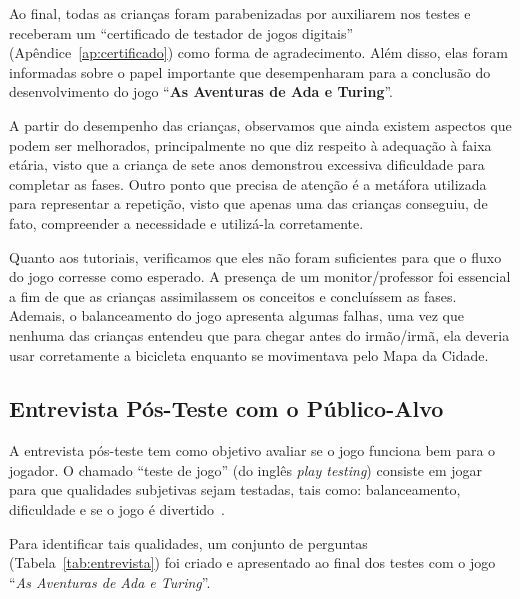Ao final, todas as crianças foram parabenizadas por auxiliarem nos testes e receberam um “certificado de testador de jogos digitais” (Apêndice~\ref{ap:certificado}) como forma de agradecimento. Além disso, elas foram informadas sobre o papel importante que desempenharam para a conclusão do desenvolvimento do jogo “\textbf{As Aventuras de Ada e Turing}”.

A partir do desempenho das crianças, observamos que ainda existem aspectos que podem ser melhorados, principalmente no que diz respeito à adequação à faixa etária, visto que a criança de sete anos demonstrou excessiva dificuldade para completar as fases. Outro ponto que precisa de atenção é a metáfora utilizada para representar a repetição, visto que apenas uma das crianças conseguiu, de fato, compreender a necessidade e utilizá-la corretamente.

Quanto aos tutoriais, verificamos que eles não foram suficientes para que o fluxo do jogo corresse como esperado. A presença de um monitor/professor foi essencial a fim de que as crianças assimilassem os conceitos e concluíssem as fases. Ademais, o balanceamento do jogo apresenta algumas falhas, uma vez que nenhuma das crianças entendeu que para chegar antes do irmão/irmã, ela deveria usar corretamente a bicicleta enquanto se movimentava pelo Mapa da Cidade.

\subsection{Entrevista Pós-Teste com o Público-Alvo} \label{ssec:entrevista}

A entrevista pós-teste tem como objetivo avaliar se o jogo funciona bem para o jogador. O chamado “teste de jogo” (do inglês \textit{play testing}) consiste em jogar para que qualidades subjetivas sejam testadas, tais como: balanceamento, dificuldade e se o jogo é divertido~\cite{schultz2005game}.

Para identificar tais qualidades, um conjunto de perguntas (Tabela~\ref{tab:entrevista}) foi criado e apresentado ao final dos testes com o jogo “\textit{As Aventuras de Ada e Turing}”.


